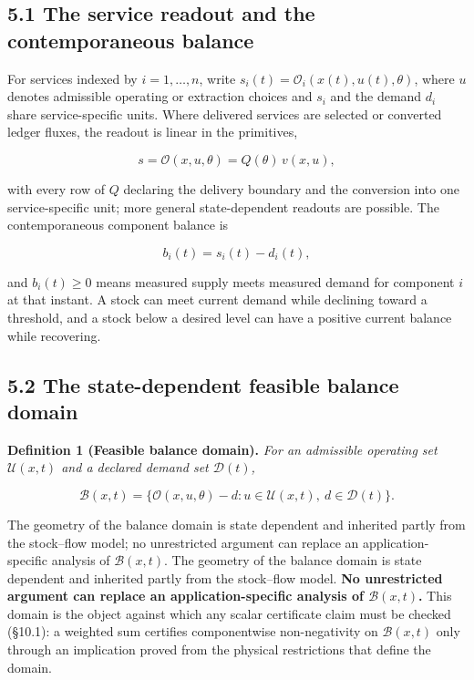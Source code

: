 \documentclass[11pt]{article}
\begin{document}
\subsection*{5.1 The service readout and the contemporaneous balance}\label{51-the-service-readout-and-the-contemporaneous-balance}

For services indexed by \(i = 1, \ldots, n\), write \(s_i(t) =\allowbreak{} \mathcal{O}_i(x(t),\allowbreak{} u(t),\allowbreak{} \theta)\), where \(u\) denotes admissible operating or extraction choices and \(s_i\) and the demand \(d_i\) share service-specific units. Where delivered services are selected or converted ledger fluxes, the readout is linear in the primitives, 

$$s = \mathcal{O}(x, u, \theta) = Q(\theta)\, v(x, u),$$

 with every row of \(Q\) declaring the delivery boundary and the conversion into one service-specific unit; more general state-dependent readouts are possible. The contemporaneous component balance is 

$$b_i(t) = s_i(t) - d_i(t),$$

 and \(b_i(t) \ge 0\) means measured supply meets measured demand for component \(i\) at that instant. A stock can meet current demand while declining toward a threshold, and a stock below a desired level can have a positive current balance while recovering.

\subsection*{5.2 The state-dependent feasible balance domain}\label{52-the-state-dependent-feasible-balance-domain}

\textbf{Definition 1 (Feasible balance domain).} \emph{For an admissible operating set \(\mathcal{U}(x,t)\) and a declared demand set \(\mathcal{D}(t)\),} 

$$\mathcal{B}(x,t) = \{ \mathcal{O}(x,u,\theta) - d : u \in \mathcal{U}(x,t),\ d \in \mathcal{D}(t) \}.$$



The geometry of the balance domain is state dependent and inherited partly from the stock--flow model; no unrestricted argument can replace an application-specific analysis of \(\mathcal{B}(x,t)\). The geometry of the balance domain is state dependent and inherited partly from the stock--flow model. \textbf{No unrestricted argument can replace an application-specific analysis of \(\mathcal B(x,t)\).} This domain is the object against which any scalar certificate claim must be checked (\S10.1): a weighted sum certifies componentwise non-negativity on \(\mathcal B(x,t)\) only through an implication proved from the physical restrictions that define the domain.
\end{document}
